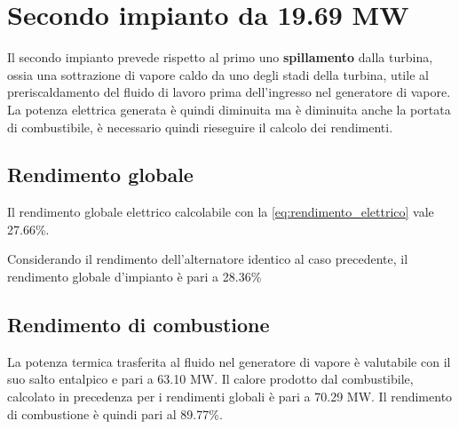\section{Secondo impianto da 19.69 MW}
Il secondo impianto prevede rispetto al primo uno \textbf{spillamento} dalla turbina, ossia una sottrazione di vapore caldo da uno degli stadi della turbina, 
utile al preriscaldamento del fluido di lavoro prima dell'ingresso nel generatore di vapore.
La potenza elettrica generata è quindi diminuita ma è diminuita anche la portata di combustibile, è necessario quindi rieseguire il calcolo dei rendimenti.
\subsection{Rendimento globale}
Il rendimento globale elettrico calcolabile con la \eqref{eq:rendimento_elettrico} vale 27.66\%.

Considerando il rendimento dell'alternatore identico al caso precedente, il rendimento globale d'impianto è pari a 28.36\%
\subsection{Rendimento di combustione}
La potenza termica trasferita al fluido nel generatore di vapore è valutabile con il suo salto entalpico e pari a 63.10 MW.
Il calore prodotto dal combustibile, calcolato in precedenza per i rendimenti globali è pari a 70.29 MW.
Il rendimento di combustione è quindi pari al 89.77\%.

